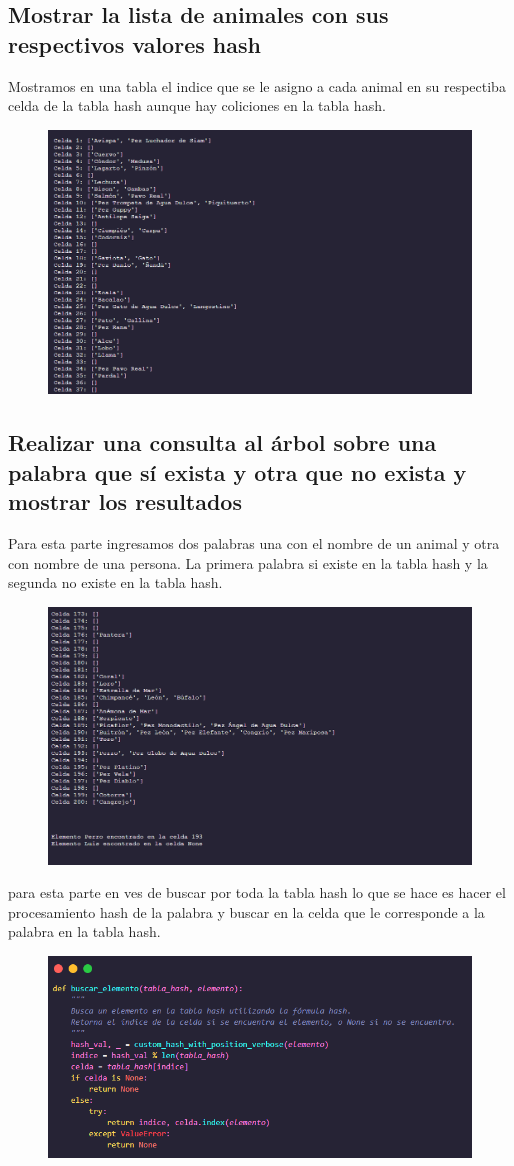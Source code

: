 \subsection{Mostrar la lista de animales con sus respectivos valores hash}

Mostramos en una tabla el indice que se le asigno a cada animal en su respectiba celda de la tabla hash aunque hay coliciones en la tabla hash.

\begin{figure}[ht]
  \centering
  \includegraphics[width=0.6\linewidth]{./src/img/hash/image5.png}
\end{figure}

\newpage
\subsection{Realizar una consulta al árbol sobre una palabra que sí exista y otra que no exista y mostrar los resultados}

Para esta parte ingresamos dos palabras una con el nombre de un animal y otra con nombre de una persona. La primera palabra si existe en la tabla hash y la segunda no existe en la tabla hash. 

\begin{figure}[ht]
  \centering
  \includegraphics[width=0.6\linewidth]{./src/img/hash/image6.png}
\end{figure}

para esta parte en ves de buscar por toda la tabla hash lo que se hace es hacer el procesamiento hash de la palabra y buscar en la celda que le corresponde a la palabra en la tabla hash.

\begin{figure}[ht]
  \centering
  \includegraphics[width=0.6\linewidth]{./src/img/hash/image7.png}
\end{figure}